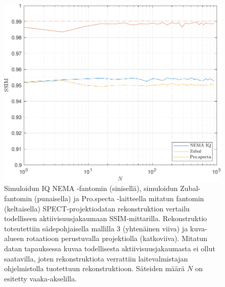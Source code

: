 \begin{figure}[H]
    \centering
    \captionsetup{width=.9\linewidth}
    \includegraphics[width=.9\linewidth]{kuvat/vertailu_SSIM.pdf}
    \caption{Simuloidun IQ NEMA -fantomin (sinisellä), simuloidun Zubal-fantomin (punaisella) ja Pro.specta -laitteella mitatun fantomin (keltaisella) SPECT-projektiodatan rekonstruktion vertailu todelliseen aktiivisuusjakaumaan SSIM-mittarilla. Rekonstruktio toteutettiin sädepohjaisella mallilla 3 (yhtenäinen viiva) ja kuva-alueen rotaatioon perustuvalla projektiolla (katkoviiva). Mitatun datan tapauksessa kuvaa todellisesta aktiivisuusjakaumasta ei ollut saatavilla, joten rekonstruktiota verrattiin laitevalmistajan ohjelmistolla tuotettuun rekonstruktioon. Säteiden määrä $N$ on esitetty vaaka-akselilla.}
    \label{fig:vertailu_SSIM}
\end{figure}
